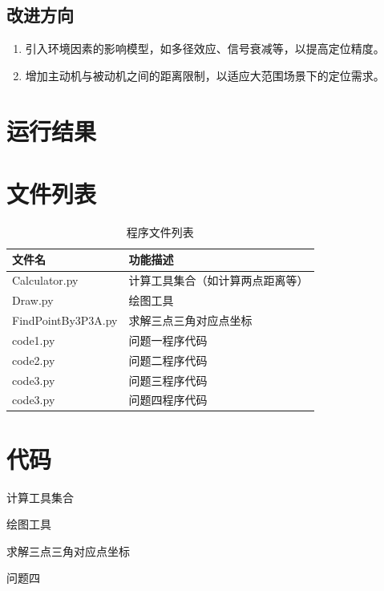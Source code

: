 \documentclass[withoutpreface,bwprint]{cumcmthesis} %
\begin{document}
\subsection{改进方向}
\begin{enumerate}
    \item 引入环境因素的影响模型，如多径效应、信号衰减等，以提高定位精度。
    \item 增加主动机与被动机之间的距离限制，以适应大范围场景下的定位需求。
\end{enumerate}




\begin{appendices}

\section{运行结果}


\section{文件列表}
\begin{table}[H]
    \caption{程序文件列表}
    \centering
    \begin{tabularx}{\textwidth}{l X}
        \bottomrule
        文件名 & 功能描述 \\
        \midrule
        Calculator.py & 计算工具集合（如计算两点距离等） \\
        Draw.py & 绘图工具 \\
        FindPointBy3P3A.py & 求解三点三角对应点坐标 \\
        code1.py & 问题一程序代码 \\
        code2.py & 问题二程序代码 \\
        code3.py & 问题三程序代码 \\
        code3.py & 问题四程序代码 \\
        \bottomrule
    \end{tabularx}
    \label{tab:文件列表}
\end{table}

\section{代码}
计算工具集合

绘图工具

求解三点三角对应点坐标

问题四


\end{appendices}
\end{document}
